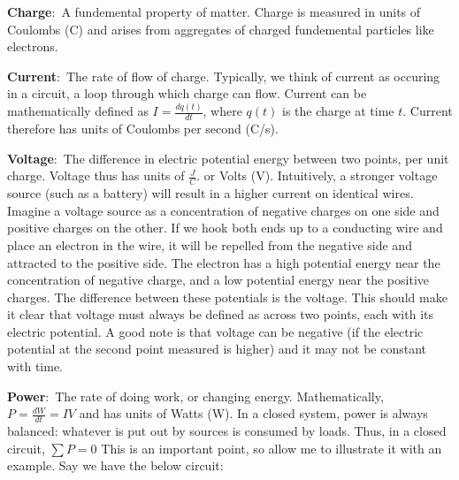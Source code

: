 \documentclass[nobib]{tufte-handout}
\newcommand{\defn}[2]{\noindent\textbf{#1}:\ #2}
\begin{document}
\defn{Charge}{A fundemental property of matter.} Charge
is measured in units of Coulombs (C) and 
arises from aggregates of charged 
fundemental particles like electrons.

\defn{Current}{The rate of flow of charge.} Typically,
we think of current as occuring in a circuit, a loop
through which charge can flow. Current can
be mathematically defined as $I = \frac{dq(t)}{dt}$, where 
$q(t)$ is the charge at time $t$. Current therefore has units
of Coulombs per second (C/s). 

\defn{Voltage}{The difference in electric potential energy
between two points, per unit charge.} Voltage thus has units of
$\frac{J}{C}$. or Volts (V).
Intuitively, a stronger voltage source (such
as a battery) will result in a higher current on 
identical wires. Imagine a voltage source
as a concentration of negative charges on
one side and positive charges on the other. 
If we hook both ends up to a conducting wire and place 
an electron in the wire, it will be repelled 
from the negative side and attracted to the
positive side. The electron has a high
potential energy near the concentration of
negative charge, and a low potential energy
near the positive charges. The difference
between these potentials is the voltage. This should
make it clear that voltage must always be
defined as across two points, each with its
electric potential. A good note is that
voltage can be negative (if the electric 
potential at the second point measured is higher)
and it may not be constant with time. 

\defn{Power}{The rate of doing work, or changing energy.} 
Mathematically, $P = \frac{dW}{dt} = IV$ and has units of Watts (W).
In a closed system, power is always balanced: whatever 
is put out by sources is consumed by
loads. Thus, in a closed circuit, $\sum P = 0$ This
is an important point, so allow me to illustrate it with 
an example. Say we have the below circuit:
\end{document}
